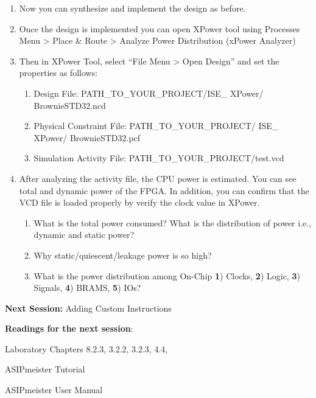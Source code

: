 \begin{enumerate}
\begin{enumerate}
	\item
	Now you can synthesize and implement the design as before.
	\item
	Once the design is implemented you can open XPower tool using
	Processes Menu \textgreater{} Place \& Route \textgreater{} Analyze
	Power Distribution (xPower Analyzer)
	\item
	Then in XPower Tool, select ``File Menu \textgreater{} Open Design''
	and set the properties as follows:
	\begin{enumerate}
		\def\labelenumii{\arabic{enumii}.}
		\item
		Design File: PATH\_TO\_YOUR\_PROJECT/ISE\_ XPower/ ﻿BrownieSTD32.ncd
		\item
		Physical Constraint File: PATH\_TO\_YOUR\_PROJECT/ ISE\_ XPower/
		﻿BrownieSTD32.pcf
		\item
		Simulation Activity File: PATH\_TO\_YOUR\_PROJECT/test.vcd
	\end{enumerate}
	\item
	After analyzing the activity file, the CPU power is estimated. You can
	see total and dynamic power of the FPGA. In addition, you can confirm
	that the VCD file is loaded properly by verify the clock value in
	XPower.
	\begin{enumerate}[label=(\alph*),start=5]
	\color{red}\item\normalcolor
	What is the total power consumed? What is the distribution of power
	i.e., dynamic and static power?
	\color{red}\item\normalcolor
	Why static/quiescent/leakage power is so high?
	\color{red}\item\normalcolor
	What is the power distribution among On-Chip \textbf{1}) Clocks,
	\textbf{2}) Logic, \textbf{3}) Signals, \textbf{4}) BRAMS, \textbf{5})
	IOs?
	\end{enumerate}
\end{enumerate}
\end{enumerate}
\textbf{Next Session:} Adding Custom Instructions

\textbf{Readings for the next session}:

Laboratory Chapters 8.2.3, 3.2.2, 3.2.3, 4.4,

ASIPmeister Tutorial

ASIPmeister User Manual
